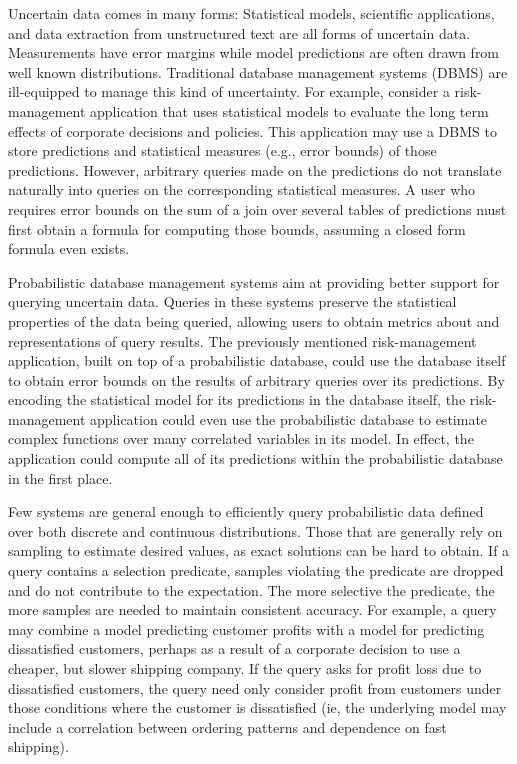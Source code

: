 Uncertain data comes in many forms: Statistical models, scientific applications, and data extraction from unstructured text are all forms of uncertain data.  Measurements have error margins while model predictions are often drawn from well known distributions.  Traditional database management systems (DBMS) are ill-equipped to manage this kind of uncertainty.  For example, consider a risk-management application that uses statistical models to evaluate the long term effects of corporate decisions and policies.  This application may use a DBMS to store predictions and statistical measures (e.g., error bounds) of those predictions.  However, arbitrary queries made on the predictions do not translate naturally into queries on the corresponding statistical measures.  A user who requires error bounds on the sum of a join over several tables of predictions must first obtain a formula for computing those bounds, assuming a closed form formula even exists.

Probabilistic  database  management  systems \cite{CKP2003, dalvi07efficient, WidomTrio2008, DM2006, KochMayBMS2008, SD2007, ORION, MCDB, BayesStore} aim at providing better support for querying uncertain data.  Queries in these systems preserve the statistical properties of the data being queried, allowing users to obtain metrics about and representations of query results.  The previously mentioned risk-management application, built on top of a probabilistic database, could use the database itself to obtain error bounds on the results of arbitrary queries over its predictions.  By encoding the statistical model for its predictions in the database itself, the risk-management application could even use the probabilistic database to estimate complex functions over many correlated variables in its model.  In effect, the application could compute all of its predictions within the probabilistic database in the first place.

Few systems are general enough to efficiently query probabilistic data defined over both discrete and continuous distributions.  Those that are generally rely on sampling to estimate desired values, as exact solutions can be hard to obtain.  If a query contains a selection predicate, samples violating the predicate are dropped and do not contribute to the expectation.  The more selective the predicate, the more samples are needed to maintain consistent accuracy.  For example, a query may combine a model predicting customer profits with a model for predicting dissatisfied customers, perhaps as a result of a corporate decision to use a cheaper, but slower shipping company.  If the query asks for profit loss due to dissatisfied customers, the query need only consider profit from customers under those conditions where the customer is dissatisfied (ie, the underlying model may include a correlation between ordering patterns and dependence on fast shipping).  

